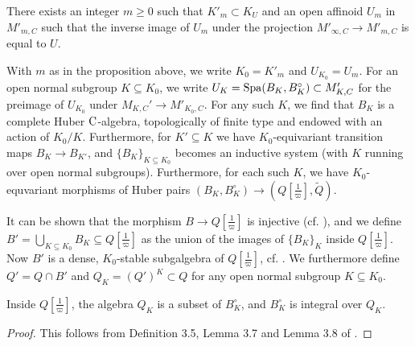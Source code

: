 \documentclass[../main.tex]{subfiles}
\begin{document}
\begin{prop}\label{prop:FiniteLevelU}
  There exists an integer $m \geq 0$ such that $K'_m \subset K_U$ and an open affinoid
  $U_m$ in $M'_{m, C}$ such that the inverse image of $U_m$ under the projection
  $M'_{\infty, C} \to M'_{m, C}$ is equal to $U$. 
\end{prop}
With $m$ as in the proposition above, we write $K_0 = K'_m$ and $U_{K_0} = 
U_m$. For an open normal subgroup $K \subseteq K_0$, we write $U_K = \operatorname{Spa}(B_K,
B^\circ_K) \subset M'_{K, C}$ for the preimage of $U_{K_0}$ under 
$M_{K,C}' \to M'_{K_0, C}$. For any such $K$, we find
that $B_K$ is a complete Huber ${\mathrm{C}}$-algebra, 
topologically of finite type and endowed with an action of $K_0/K$. Furthermore,
for $K' \subseteq K$ we have $K_0$-equivariant transition maps $B_{K} \to B_{K'}$,
and $\{B_K\}_{K \subseteq K_0}$ becomes an inductive system (with $K$ running over 
open normal subgroups). Furthermore, for each such $K$, we have $K_0$-equvariant morphisms
of Huber pairs $(B_K, B_K^\circ) \to (Q[\tfrac 1\varpi], \tilde Q)$.

It can be shown that the morphism $B \to Q[\tfrac 1\varpi]$ is injective
(cf. \cite[Lemma 3.4]{mieda2016geometric}), and we define $B' =
\bigcup_{K\subseteq K_0} B_K \subseteq Q[\tfrac 1\varpi]$ as the union
of the images of $\{B_K\}_K$ inside $Q[\tfrac 1\varpi]$. Now $B'$ 
is a dense, $K_0$-stable subgalgebra of $Q[\tfrac 1\varpi]$, cf.
\cite[Proposition 4.5]{mieda2016geometric}. We furthermore define
$Q' = Q \cap B'$ and $Q_K = (Q')^K \subset Q$ for any open normal subgroup $K
\subseteq K_0$. 

\begin{lem}\label{lem:BKisIntegralOverQK}
  Inside $Q[\tfrac 1\varpi]$, the algebra $Q_K$ is a subset of $B_K^\circ$,
  and $B_K^\circ$ is integral over $Q_K$. 
\begin{proof}
  This follows from Definition 3.5, Lemma 3.7 and Lemma 3.8 of \cite{mieda2016geometric}. 
\end{proof}
\end{lem}
\end{document}
